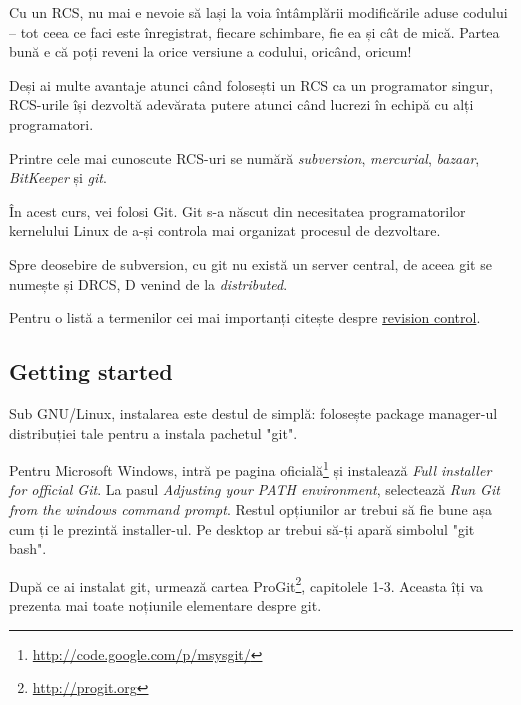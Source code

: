 Cu un RCS, nu mai e nevoie să lași la voia întâmplării modificările
aduse codului -- tot ceea ce faci este înregistrat, fiecare schimbare,
fie ea și cât de mică. Partea bună e că poți reveni la orice versiune
a codului, oricând, oricum!

Deși ai multe avantaje atunci când folosești un RCS ca un programator singur,
RCS-urile își dezvoltă adevărata putere atunci când lucrezi în echipă
cu alți programatori.

Printre cele mai cunoscute RCS-uri se numără \textit{subversion},
\textit{mercurial}, \textit{bazaar}, \textit{BitKeeper} și \textit{git}.

În acest curs, vei folosi Git. Git s-a născut din necesitatea
programatorilor kernelului Linux de a-și controla mai organizat
procesul de dezvoltare.

Spre deosebire de subversion, cu git nu există un server central,
de aceea git se numește și DRCS, D venind de la \textsl{distributed}.

Pentru o listă a termenilor cei mai importanți citește despre
\href{http://en.wikipedia.org/wiki/Revision_control}{revision control}.

\subsection{Getting started}
Sub GNU/Linux, instalarea este destul de simplă: folosește
package manager-ul distribuției tale pentru a instala pachetul "git".

Pentru Microsoft Windows,
intră pe pagina oficială\footnote{\url{http://code.google.com/p/msysgit/}}
și instalează \textit{Full installer for official Git}. La pasul
\textit{Adjusting your PATH environment}, selectează \textit{Run
Git from the windows command prompt}. Restul opțiunilor ar trebui
să fie bune așa cum ți le prezintă installer-ul. Pe desktop ar trebui
să-ți apară simbolul "git bash".

După ce ai instalat git, urmează cartea ProGit\footnote{\url{http://progit.org}},
capitolele 1-3. Aceasta îți va prezenta mai toate noțiunile elementare
despre git.

